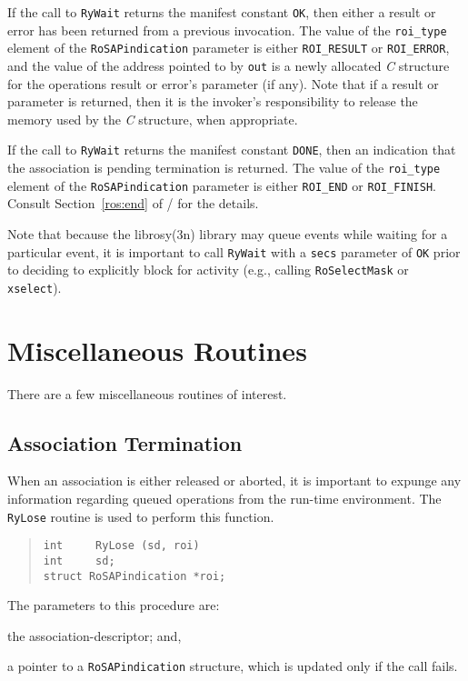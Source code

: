 If the call to \verb"RyWait" returns the manifest constant \verb"OK",
then either a result or error has been returned from a previous invocation.
The value of the \verb"roi_type" element of the \verb"RoSAPindication"
parameter is either \verb"ROI_RESULT" or \verb"ROI_ERROR",
and the value of the address pointed to by \verb"out" is a newly allocated
{\em C\/} structure for the operations result or error's parameter (if any).
Note that if a result or parameter is returned,
then it is the invoker's responsibility to release the memory used by the
{\em C\/} structure, when appropriate.

If the call to \verb"RyWait" returns the manifest constant \verb"DONE",
then an indication that the association is pending termination is returned.
The value of the \verb"roi_type" element of the \verb"RoSAPindication"
parameter is either \verb"ROI_END" or \verb"ROI_FINISH".
Consult Section~\ref{ros:end} of \volone/ for the details.

Note that because the \man librosy(3n) library may queue events while waiting
for a particular event,
it is important to call \verb"RyWait" with a \verb"secs" parameter of
\verb"OK" prior to deciding to explicitly block for activity
(e.g., calling \verb"RoSelectMask" or \verb"xselect").

\section	{Miscellaneous Routines}
There are a few miscellaneous routines of interest.

\subsection	{Association Termination}
When an association is either released or aborted,
it is important to expunge any information regarding queued operations from
the run-time environment.
The \verb"RyLose" routine is used to perform this function.
\begin{quote}\small\begin{verbatim}
int     RyLose (sd, roi)
int     sd;
struct RoSAPindication *roi;
\end{verbatim}\end{quote}
The parameters to this procedure are:
\begin{describe}
\item[\verb"sd":] the association-descriptor;
and,

\item[\verb"roi":] a pointer to a \verb"RoSAPindication" structure,
which is updated only if the call fails.
\end{describe}

